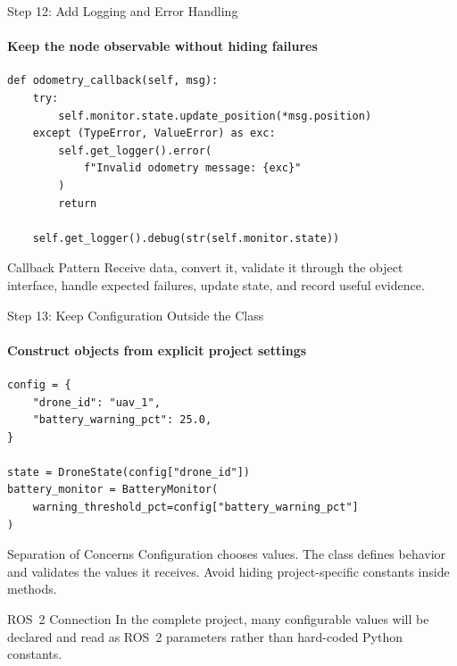 \begin{frame}[fragile]{Step 12: Add Logging and Error Handling}
\framesubtitle{Keep the node observable without hiding failures}

\begin{verbatim}
def odometry_callback(self, msg):
    try:
        self.monitor.state.update_position(*msg.position)
    except (TypeError, ValueError) as exc:
        self.get_logger().error(
            f"Invalid odometry message: {exc}"
        )
        return

    self.get_logger().debug(str(self.monitor.state))
\end{verbatim}

\begin{block}{Callback Pattern}
    Receive data, convert it, validate it through the object interface, handle
    expected failures, update state, and record useful evidence.
\end{block}
\end{frame}


\begin{frame}[fragile]{Step 13: Keep Configuration Outside the Class}
\framesubtitle{Construct objects from explicit project settings}

\begin{verbatim}
config = {
    "drone_id": "uav_1",
    "battery_warning_pct": 25.0,
}

state = DroneState(config["drone_id"])
battery_monitor = BatteryMonitor(
    warning_threshold_pct=config["battery_warning_pct"]
)
\end{verbatim}

\begin{block}{Separation of Concerns}
    Configuration chooses values. The class defines behavior and validates the
    values it receives. Avoid hiding project-specific constants inside methods.
\end{block}

\begin{exampleblock}{ROS~2 Connection}
    In the complete project, many configurable values will be declared and read as
    ROS~2 parameters rather than hard-coded Python constants.
\end{exampleblock}
\end{frame}



